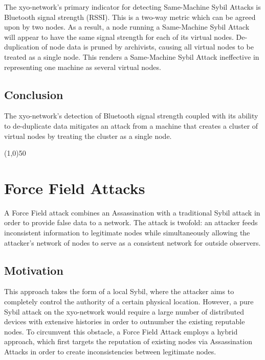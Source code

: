 \documentclass{article}
\begin{document}
The \Gls{xyo-network}'s primary indicator for detecting Same-Machine Sybil Attacks is Bluetooth signal strength (RSSI). This is a two-way metric which can be agreed upon by two nodes. As a result, a node running a Same-Machine Sybil Attack will appear to have the same signal strength for each of its virtual nodes. De-duplication of node data is pruned by \Glspl{archivist}, causing all virtual nodes to be treated as a single node. This renders a Same-Machine Sybil Attack ineffective in representing one machine as several virtual nodes.

\subsection{Conclusion}

The \Gls{xyo-network}'s detection of Bluetooth signal strength coupled with its ability to de-duplicate data mitigates an attack from a machine that creates a cluster of virtual nodes by treating the cluster as a single node.

\begin{center}
\line(1,0){50}
\end{center}

\section{Force Field Attacks}
A Force Field attack combines an Assassination with a traditional Sybil attack in order to provide false data to a network. The attack is twofold: an attacker feeds inconsistent information to legitimate nodes while simultaneously allowing the attacker's network of nodes to serve as a consistent network for outside observers.

\subsection{Motivation}

This approach takes the form of a local Sybil, where the attacker aims to completely control the authority of a certain physical location. However, a pure Sybil attack on the \Gls{xyo-network} would require a large number of distributed devices with extensive histories in order to outnumber the existing reputable nodes. To circumvent this obstacle, a Force Field Attack employs a hybrid approach, which first targets the reputation of existing nodes via Assassination Attacks in order to create inconsistencies between legitimate nodes.
\end{document}
